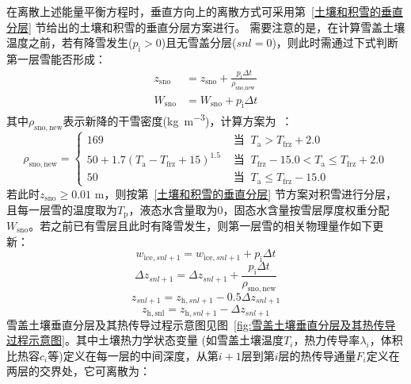 在离散上述能量平衡方程时，垂直方向上的离散方式可采用第~\ref{土壤和积雪的垂直分层} 节给出的土壤和积雪的垂直分层方案进行。
需要注意的是，在计算雪盖土壤温度之前，若有降雪发生($p_{\mathrm {i}} >0$)且无雪盖分层($snl=0$)，则此时需通过下式判断第一层雪能否形成：
\begin{equation}
  \begin{aligned}
    z_{\mathrm{sno}} &= z_{\mathrm{sno}}+\frac{p_{\mathrm{i}} \Delta t}{\rho_{\text {sno,new }}} \\[1ex]
    W_{\mathrm{sno}} &= W_{\mathrm{sno}}+p_{\mathrm{i}} \Delta t
  \end{aligned}
\end{equation}
其中$\rho_{\mathrm{sno,new}}$表示新降的干雪密度(\unit{kg.m^{-3}})，计算方案为~\citep{anderson1976point}：
\begin{equation}
  \rho_{\mathrm{sno, new}}=\begin{cases}
    169 & \text { 当 }\ T_{\mathrm{a}}>T_{\mathrm{frz}}+2.0 \\
    50+1.7\left(T_{\mathrm{a}}-T_{\mathrm{frz}}+15\right)^{1.5}  & \text { 当 }\ T_{\mathrm{frz}}-15.0<T_{\mathrm{a}} \leqslant T_{\mathrm{frz}}+2.0 \\
    50 & \text { 当 }\ T_{\mathrm{a}} \leqslant T_{\mathrm{frz}}-15.0
  \end{cases}
\end{equation}
若此时$z_{\mathrm{sno}} \geqslant 0.01$ \unit{m}，则按第~\ref{土壤和积雪的垂直分层} 节方案对积雪进行分层，且每一层雪的温度取为$T_{\mathrm {p}} $，液态水含量取为0，固态水含量按雪层厚度权重分配$W_{\mathrm{sno}}$。若之前已有雪层且此时有降雪发生，则第一层雪的相关物理量作如下更新：
\begin{equation}
  w_{\mathrm{ice},snl+1}=w_{\mathrm{ice},snl+1}+p_{\mathrm{i}} \Delta t
\end{equation}
\begin{equation}
  \Delta z_{snl+1}=\Delta z_{snl+1}+\frac{p_{\mathrm{i}} \Delta t}{\rho_{\mathrm{sno, new}}}
\end{equation}
\begin{equation}
  z_{snl+1}=z_{\mathrm{h},snl+1}-0.5 \Delta z_{snl+1}
\end{equation}
\begin{equation}
  z_{\mathrm{h, snl}}=z_{\mathrm{h},snl+1}-\Delta z_{snl+1}
\end{equation}
雪盖土壤垂直分层及其热传导过程示意图见图~\ref{fig:雪盖土壤垂直分层及其热传导过程示意图}。其中土壤热力学状态变量
(如雪盖土壤温度$T_{i} $，热力传导率$\lambda_i$，体积比热容$c_i$等)定义在每一层的中间深度，从第$i+1$层到第$i$层的热传导通量$F_i$定义在两层的交界处，它可离散为：
